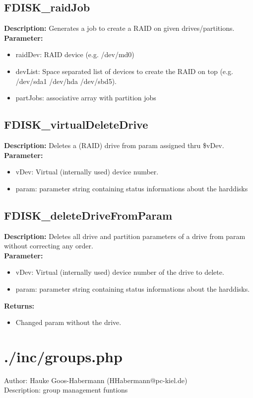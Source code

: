 \subsection{FDISK\_raidJob}
\textbf{Description:} Generates a job to create a RAID on given drives/partitions.\\
\textbf{Parameter:}
\begin{itemize}
\item raidDev: RAID device (e.g. /dev/md0)
\item devList: Space separated list of devices to create the RAID on top (e.g. /dev/sda1 /dev/hda /dev/sbd5).
\item partJobs: associative array with partition jobs
\end{itemize}

\subsection{FDISK\_virtualDeleteDrive}
\textbf{Description:} Deletes a (RAID) drive from param assigned thru \$vDev.\\
\textbf{Parameter:}
\begin{itemize}
\item vDev: Virtual (internally used) device number.
\item param: parameter string containing status informations about the harddisks
\end{itemize}

\subsection{FDISK\_deleteDriveFromParam}
\textbf{Description:} Deletes all drive and partition parameters of a drive from param without correcting any order.\\
\textbf{Parameter:}
\begin{itemize}
\item vDev: Virtual (internally used) device number of the drive to delete.
\item param: parameter string containing status informations about the harddisks.
\end{itemize}
\textbf{Returns:}
\begin{itemize}
\item Changed param without the drive.
\end{itemize}

\newpage\section{./inc/groups.php}
 Author: Hauke Goos-Habermann (HHabermann@pc-kiel.de)\\
 Description: group management funtions\\

